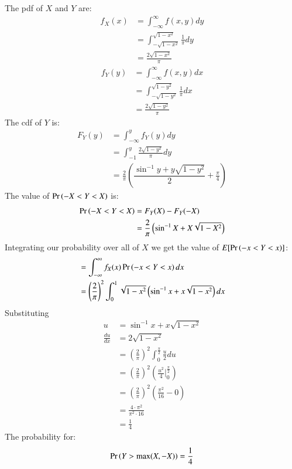 
The pdf of $X$ and $Y$ are:
\begin{align}
    f_X(x)&=\int_{-\infty}^{\infty}f(x,y)dy\\
    &=\int_{-\sqrt{1-x^2}}^{\sqrt{1-x^2}}\frac{1}{\pi}dy\\
    &=\frac{2\sqrt{1-x^2}}{\pi}
\end{align}
\begin{align}
    f_Y(y)&=\int_{-\infty}^{\infty}f(x,y)dx\\
    &=\int_{-\sqrt{1-y^2}}^{\sqrt{1-y^2}}\frac{1}{\pi}dx\\
    &=\frac{2\sqrt{1-y^2}}{\pi}
\end{align}
The cdf of $Y$ is:
\begin{align}
    F_Y(y)&=\int_{-\infty}^{y}f_Y(y)dy\\
    &=\int_{-1}^{y}\frac{2\sqrt{1-y^2}}{\pi}dy\\
    &=\frac{2}{\pi}\left(\dfrac{\sin^{-1}{y} + y\sqrt{1-y^2}}{2} + \frac{\pi}{4}\right)
\end{align}
The value of $\Pr\left(-X<Y<X\right)$ is:
\begin{align}
\Pr\left(-X<Y<X\right) &=F_Y(X)-F_Y(-X)\\
 &=\frac{2}{\pi}\left(\sin^{-1}{X} + X\sqrt{1-X^2}\right)
\end{align}
Integrating our probability over all of $X$ we get the value of $ E[\Pr\left(-x<Y<x\right)]$:
\begin{align}
&=\int_{-\infty}^{\infty}f_X(x)\Pr\left(-x<Y<x\right)dx\\
    &=\left(\frac{2}{\pi}\right)^2\int_0^1\sqrt{1-x^2}\left(\sin^{-1}{x} + x\sqrt{1-x^2}\right)dx
\end{align}
Substituting
\begin{align} 
u &= \sin^{-1}{x} + x\sqrt{1-x^2}\\
\frac{du}{dx} &= 2\sqrt{1-x^2}\\
&=\left(\frac{2}{\pi}\right)^2\int_0^{\frac{\pi}{2}}\frac{u}{2}du\\
&=\left(\frac{2}{\pi}\right)^2\left(\frac{u^2}{4} \bigg |_0^{\frac{\pi}{2}}\right)\\
&=\left(\frac{2}{\pi}\right)^2\left(\frac{\pi^2}{16} - 0\right)\\
    &=\frac{4\cdot{\pi}^2}{{\pi}^2\cdot16}\\
    &=\frac{1}{4}
\end{align}
The probability for:
\begin{align}
    \Pr\left(Y>\text{max}(X,-X)\right) = \frac{1}{4}
\end{align}